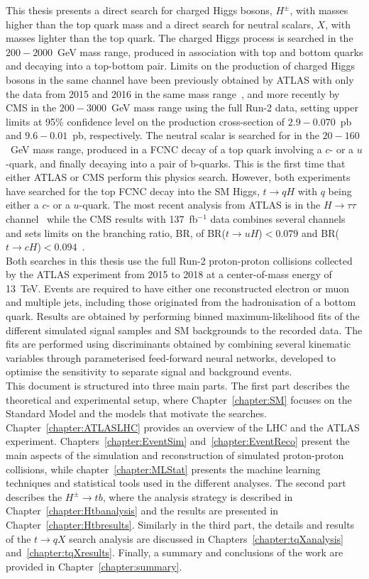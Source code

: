 This thesis presents a direct search for charged Higgs bosons, $H^{\pm}$, with masses higher than the top quark mass and a direct search for neutral scalars, $X$, with masses lighter than the top quark. The charged Higgs process is searched in the $200-2000$~GeV mass range, produced in association with top and bottom quarks and decaying into a top-bottom pair. Limits on the production of charged Higgs bosons in the same channel have been previously obtained by ATLAS with only the data from 2015 and 2016 in the same mass range~\cite{ATLASHptb2018}, and more recently by CMS in the $200-3000$~GeV mass range using the full Run-2 data, setting upper limits at 95\% confidence level on the production cross-section of $2.9-0.070$~pb and $9.6-0.01$~pb, respectively. The neutral scalar is searched for in the $20-160$~GeV mass range, produced in a FCNC decay of a top quark involving a $c$- or a $u$-quark, and finally decaying into a pair of b-quarks. This is the first time that either ATLAS or CMS perform this physics search. However, both experiments have searched for the top FCNC decay into the SM Higgs, $t\to qH$ with $q$ being either a $c$- or a $u$-quark. The most recent analysis from ATLAS is in the $H\to\tau\tau$ channel~\cite{ATLAStqHtautau} while the CMS results with 137~fb$^{-1}$ data combines several channels and sets limits on the branching ratio, BR, of BR($t\to uH$)$ < 0.079$ and BR($t\to cH$)$ < 0.094$~\cite{CMStqHRun2}.\\ 

Both searches in this thesis use the full Run-2 proton-proton collisions collected by the ATLAS experiment from 2015 to 2018 at a center-of-mass energy of 13~TeV. Events are required to have either one reconstructed electron or muon and multiple jets, including those originated from the hadronisation of a bottom quark. Results are obtained by performing binned maximum-likelihood fits of the different simulated signal samples and SM backgrounds to the recorded data. The fits are performed using discriminants obtained by combining several kinematic variables through parameterised feed-forward neural networks, developed to optimise the sensitivity to separate signal and background events.\\

This document is structured into three main parts. The first part describes the theoretical and experimental setup, where Chapter~\ref{chapter:SM} focuses on the Standard Model and the models that motivate the searches. Chapter~\ref{chapter:ATLASLHC} provides an overview of the LHC and the ATLAS experiment. Chapters~\ref{chapter:EventSim} and~\ref{chapter:EventReco} present the main aspects of the simulation and reconstruction of simulated proton-proton collisions, while chapter~\ref{chapter:MLStat} presents the machine learning techniques and statistical tools used in the different analyses. The second part describes the $H^\pm\to tb$, where the analysis strategy is described in Chapter~\ref{chapter:Htbanalysis} and the results are presented in Chapter~\ref{chapter:Htbresults}. Similarly in the third part, the details and results of the $t\to qX$ search analysis are discussed in Chapters~\ref{chapter:tqXanalysis} and~\ref{chapter:tqXresults}. Finally, a summary and conclusions of the work are provided in Chapter~\ref{chapter:summary}.